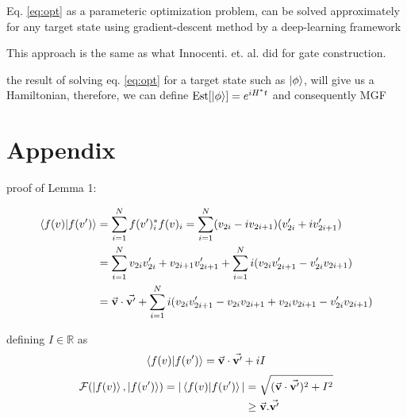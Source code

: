 \documentclass{article}
\DeclareMathOperator*{\est}{Est}
\begin{document}
Eq. \ref{eq:opt} as a parameteric optimization problem, can be solved approximately for any target state using gradient-descent method by a deep-learning framework

This approach is the same as what Innocenti. et. al. did for gate construction.

the result of solving eq. \ref{eq:opt} for a target state such as $\ket{\phi}$, will give us a Hamiltonian, therefore, we can define $\est[\ket{\phi}] = e^{iH^*t}$ and consequently MGF

\section*{Appendix}
proof of Lemma 1:

\begin{align*} \braket{f(v)}{f(v')} &= \sum_{i=1}^N f(v')_i^* f(v)_i = \sum_{i=1}^N (v_{2i} - iv_{2i+1}) (v'_{2i} + iv'_{2i+1}) \\
& = \sum_{i=1}^N v_{2i}v'_{2i} + v_{2i+1}v'_{2i+1} +  \sum_{i=1}^N i(v_{2i}v'_{2i+1} - v'_{2i}v_{2i+1}) \\
& = \va{v}\cdot\va{v'} + \sum_{i=1}^N i(v_{2i}v'_{2i+1} - v_{2i}v_{2i+1} + v_{2i}v_{2i+1}- v'_{2i}v_{2i+1}) \end{align*}

defining $I \in \mathbb{R}$ as
\[ \braket{f(v)}{f(v')} = \va{v}\cdot\va{v'} + iI \]
\begin{align*} \mathcal{F}(\ket{f(v)}, \ket{f(v')}) = |\braket{f(v)}{f(v')}| &= \sqrt{(\va{v}\cdot\va{v'})^2 + I^2} \\
& \ge \va{v}.\va{v'}
\end{align*}
\end{document}
